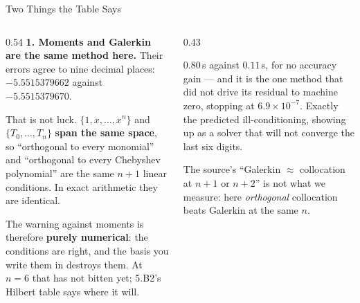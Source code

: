 \begin{frame}{Two Things the Table Says}
\begin{columns}[T]
\begin{column}{0.54\textwidth}
\small
\textbf{1. Moments and Galerkin are the same method here.} Their errors agree to nine decimal places: $-5.5515379662$ against $-5.5515379670$.
\medskip

That is not luck. $\{1,x,\dots,x^{n}\}$ and $\{T_0,\dots,T_n\}$ \textbf{span the same space}, so ``orthogonal to every monomial'' and ``orthogonal to every Chebyshev polynomial'' are the same $n+1$ linear conditions. In exact arithmetic they are identical.
\medskip

The warning against moments is therefore \textbf{purely numerical}: the conditions are right, and the basis you write them in destroys them. At $n=6$ that has not bitten yet; 5.B2's Hilbert table says where it will.
\end{column}
\begin{column}{0.43\textwidth}
\begin{cautionbox}[title=\textbf{2. Least squares is 7x slower}]\small
$0.80$\,s against $0.11$\,s, for no accuracy gain --- and it is the one method that did not drive its residual to machine zero, stopping at $6.9\times10^{-7}$.
\medskip
Exactly the predicted ill-conditioning, showing up as a solver that will not converge the last six digits.
\end{cautionbox}
\medskip
\begin{examplebox}\footnotesize
The source's ``Galerkin $\approx$ collocation at $n+1$ or $n+2$'' is not what we measure: here \emph{orthogonal} collocation beats Galerkin at the same $n$.
\end{examplebox}
\end{column}
\end{columns}
\vspace{1mm}
\end{frame}

